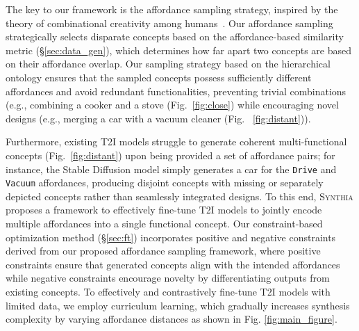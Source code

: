 The key to our framework is the affordance sampling strategy, inspired by the theory of combinational creativity among humans~\cite{Han2018THECD}. Our affordance sampling strategically selects disparate concepts based on the affordance-based similarity metric (\S\ref{sec:data_gen}), which determines how far apart two concepts are based on their affordance overlap. Our sampling strategy based on the hierarchical ontology ensures that the sampled concepts possess sufficiently different affordances and avoid redundant functionalities, preventing trivial combinations (e.g., combining a cooker and a stove (Fig.~\ref{fig:close}) while encouraging novel designs (e.g., merging a car with a vacuum cleaner (Fig. ~\ref{fig:distant})). 

Furthermore, existing T2I models struggle to generate coherent multi-functional concepts (Fig.~\ref{fig:distant}) upon being provided a set of affordance pairs; for instance, the Stable Diffusion model simply generates a car for the \texttt{Drive} and \texttt{Vacuum} affordances, producing disjoint concepts with missing or separately depicted concepts rather than seamlessly integrated designs. To this end, \textsc{Synthia} proposes a framework to effectively fine-tune T2I models to jointly encode multiple affordances into a single functional concept. Our constraint-based optimization method (\S \ref{sec:ft}) incorporates positive and negative constraints derived from our proposed affordance sampling framework, where positive constraints ensure that generated concepts align with the intended affordances while negative constraints encourage novelty by differentiating outputs from existing concepts.  To effectively and contrastively fine-tune T2I models with limited data, we employ curriculum learning, which gradually increases synthesis complexity by varying affordance distances as shown in Fig. \ref{fig:main_figure}.
